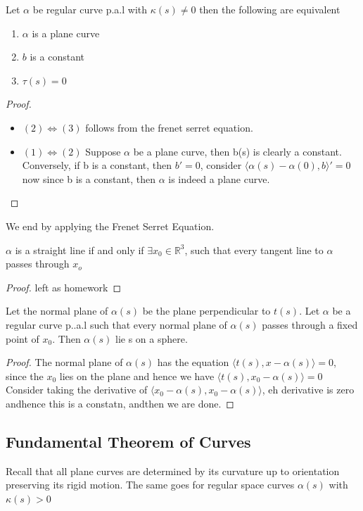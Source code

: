 \documentclass{article}
\begin{document}
\begin{theorem}
    Let $\alpha$ be regular curve p.a.l with $\kappa(s)\neq 0$ then the following are equivalent
    \begin{enumerate}
        \item $\alpha$ is a plane curve 
        \item $b$ is a constant
        \item $\tau(s)=0$
\end{enumerate}
\end{theorem}
\begin{proof}
    \begin{itemize}
        \item $(2) \Leftrightarrow (3)$ follows from the frenet serret equation.
        \item $(1)\Leftrightarrow (2)$ Suppose $\alpha$ be a plane curve, then b(s) is clearly a constant. Conversely, if b is a constant, then $b'=0$, consider $\langle \alpha(s)-\alpha(0),b\rangle '=0$ now since b is a constant, then $\alpha$ is indeed a plane curve.
    \end{itemize}
\end{proof}
We end by applying the Frenet Serret Equation.
\begin{example}
    $\alpha$ is a straight line if and only if $\exists x_0\in \mathbb{R}^3$, such that every tangent line to $\alpha $ passes through $x_o$
\end{example}
\begin{proof}
    left as homework
\end{proof}
\begin{example}
    Let the normal plane of $\alpha(s)$ be the plane perpendicular to $t(s)$. Let $\alpha$ be a regular curve p..a.l such that every normal plane of $\alpha(s)$ passes through a fixed point of $x_0$. Then $\alpha(s)$ lie s on a sphere.
\end{example}
\begin{proof}
    The normal plane of $\alpha(s)$ has the equation $\langle t(s), x-\alpha(s)\rangle =0$, since the $x_0$ lies on the plane and hence we have  $\langle t(s), x_0-\alpha(s)\rangle =0$ Consider taking the derivative of $\langle x_0-\alpha(s),x_0-\alpha(s)\rangle$, eh derivative is zero andhence this is a constatn, andthen we are done.
\end{proof}

\subsection{Fundamental Theorem of Curves}
Recall that all plane curves are determined by its curvature up to orientation preserving its rigid motion. The same goes for regular space curves $\alpha (s)$ with $\kappa(s)>0$
\end{document}
